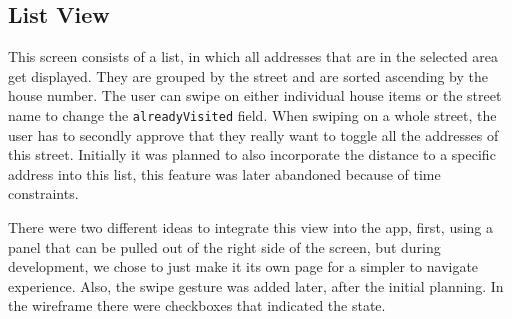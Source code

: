 \subsection{List View}

This screen consists of a list, in which all addresses that are in the selected area get displayed. They are grouped by the street and are sorted ascending by the house number. The user can swipe on either individual house items or the street name to change the \texttt{alreadyVisited} field. When swiping on a whole street, the user has to secondly approve that they really want to toggle all the addresses of this street. Initially it was planned to also incorporate the distance to a specific address into this list, this feature was later abandoned because of time constraints. 

\blankLine

There were two different ideas to integrate this view into the app, first, using a panel that can be pulled out of the right side of the screen, but during development, we chose to just make it its own page for a simpler to navigate experience. Also, the swipe gesture was added later, after the initial planning. In the wireframe there were checkboxes that indicated the state.

